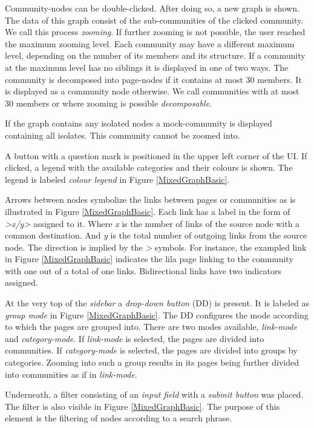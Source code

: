 Community-nodes can be double-clicked. After doing so, a new graph is shown. The data of this graph consist of the sub-communities of the clicked community. We call this process \textit{zooming}. If further zooming is not possible, the user reached the maximum zooming level. Each community may have a different maximum level, depending on the number of its members and its structure. If a community at the maximum level has no siblings it is displayed in one of two ways. The community is decomposed into page-nodes if it contains at most 30 members. It is displayed as a community node otherwise. We call communities with at most 30 members or where zooming is possible \textit{decomposable}. 

If the graph contains any isolated nodes a mock-community is displayed containing all isolates. This community cannot be zoomed into. 

A button with a question mark is positioned in the upper left corner of the UI. If clicked, a legend with the available categories and their colours is shown. The legend is labeled \textit{colour legend} in Figure \ref{MixedGraphBasic}.

Arrows between nodes symbolize the links between pages or communities as is illustrated in Figure \ref{MixedGraphBasic}. Each link has a label in the form of \textit{>x/y>} assigned to it. Where \textit{x} is the number of links of the source node with a common destination. And \textit{y} is the total number of outgoing links from the source node. The direction is implied by the \textit{>} symbols. For instance, the exampled link in Figure \ref{MixedGraphBasic} indicates the lila page linking to the community with one out of a total of one links. Bidirectional links have two indicators assigned.

At the very top of the \textit{sidebar} a \textit{drop-down button} (DD) is present. It is labeled as \textit{group mode} in Figure \ref{MixedGraphBasic}. The DD configures the mode according to which the pages are grouped into. There are two modes available, \textit{link-mode} and \textit{category-mode}. If \textit{link-mode} is selected, the pages are divided into communities. If \textit{category-mode} is selected, the pages are divided into groups by categories. Zooming into such a group results in its pages being further divided into communities as if in \textit{link-mode}. 

Underneath, a filter consisting of an \textit{input field} with a \textit{submit button} was placed. The filter is also visible in Figure \ref{MixedGraphBasic}. The purpose of this element is the filtering of nodes according to a search phrase.

